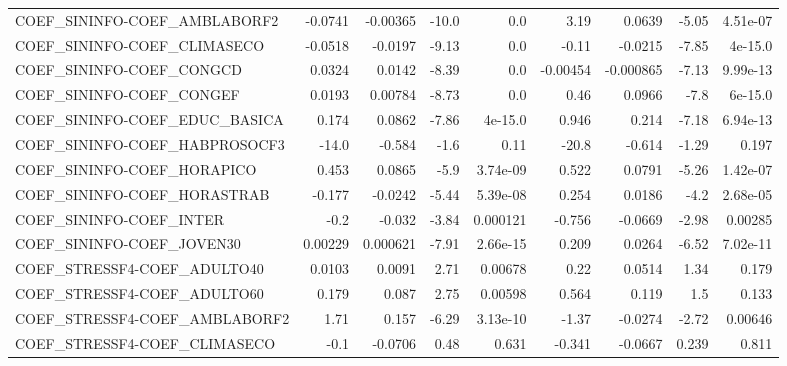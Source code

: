 \begin{tabular}{lrrrrrrrr}
COEF\_SININFO-COEF\_AMBLABORF2           &     -0.0741 &     -0.00365 &   -10.0 &      0.0 &       3.19 &      0.0639 &        -5.05 &      4.51e-07 \\
COEF\_SININFO-COEF\_CLIMASECO            &     -0.0518 &      -0.0197 &   -9.13 &      0.0 &      -0.11 &     -0.0215 &        -7.85 &       4e-15.0 \\
COEF\_SININFO-COEF\_CONGCD               &      0.0324 &       0.0142 &   -8.39 &      0.0 &   -0.00454 &   -0.000865 &        -7.13 &      9.99e-13 \\
COEF\_SININFO-COEF\_CONGEF               &      0.0193 &      0.00784 &   -8.73 &      0.0 &       0.46 &      0.0966 &         -7.8 &       6e-15.0 \\
COEF\_SININFO-COEF\_EDUC\_BASICA          &       0.174 &       0.0862 &   -7.86 &  4e-15.0 &      0.946 &       0.214 &        -7.18 &      6.94e-13 \\
COEF\_SININFO-COEF\_HABPROSOCF3          &       -14.0 &       -0.584 &    -1.6 &     0.11 &      -20.8 &      -0.614 &        -1.29 &         0.197 \\
COEF\_SININFO-COEF\_HORAPICO             &       0.453 &       0.0865 &    -5.9 & 3.74e-09 &      0.522 &      0.0791 &        -5.26 &      1.42e-07 \\
COEF\_SININFO-COEF\_HORASTRAB            &      -0.177 &      -0.0242 &   -5.44 & 5.39e-08 &      0.254 &      0.0186 &         -4.2 &      2.68e-05 \\
COEF\_SININFO-COEF\_INTER                &        -0.2 &       -0.032 &   -3.84 & 0.000121 &     -0.756 &     -0.0669 &        -2.98 &       0.00285 \\
COEF\_SININFO-COEF\_JOVEN30              &     0.00229 &     0.000621 &   -7.91 & 2.66e-15 &      0.209 &      0.0264 &        -6.52 &      7.02e-11 \\
COEF\_STRESSF4-COEF\_ADULTO40            &      0.0103 &       0.0091 &    2.71 &  0.00678 &       0.22 &      0.0514 &         1.34 &         0.179 \\
COEF\_STRESSF4-COEF\_ADULTO60            &       0.179 &        0.087 &    2.75 &  0.00598 &      0.564 &       0.119 &          1.5 &         0.133 \\
COEF\_STRESSF4-COEF\_AMBLABORF2          &        1.71 &        0.157 &   -6.29 & 3.13e-10 &      -1.37 &     -0.0274 &        -2.72 &       0.00646 \\
COEF\_STRESSF4-COEF\_CLIMASECO           &        -0.1 &      -0.0706 &    0.48 &    0.631 &     -0.341 &     -0.0667 &        0.239 &         0.811 \\

\end{tabular}
